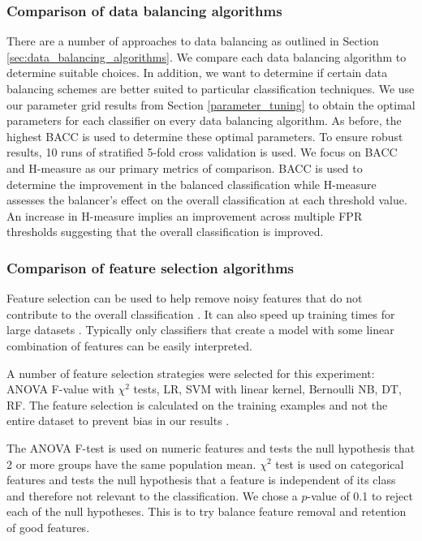 \documentclass{sig-alternate-05-2015}
\begin{document}
	\subsubsection{Comparison of data balancing algorithms}
	There are a number of approaches to data balancing as outlined in Section \ref{sec:data_balancing_algorithms}. We compare each data balancing algorithm to determine suitable choices. In addition, we want to determine if certain data balancing schemes are better suited to particular classification techniques. We use our parameter grid results from Section \ref{parameter_tuning} to obtain the optimal parameters for each classifier on every data balancing algorithm. As before, the highest BACC is used to determine these optimal parameters. To ensure robust results, 10 runs of stratified 5-fold cross validation is used. We focus on BACC and H-measure as our primary metrics of comparison. BACC is used to determine the improvement in the balanced classification while H-measure assesses the balancer's effect on the overall classification at each threshold value. An increase in H-measure implies an improvement across multiple FPR thresholds suggesting that the overall classification is improved.
	
	\subsubsection{Comparison of feature selection algorithms}
	Feature selection can be used to help remove noisy features that do not contribute to the overall classification \cite{Guyon:2003:IVF:944919.944968}. It can also speed up training times for large datasets \cite{Guyon:2003:IVF:944919.944968}. Typically only classifiers that create a model with some linear combination of features can be easily interpreted.
	
	A number of feature selection strategies were selected for this experiment: ANOVA F-value with $\chi^2$ tests, LR, SVM with linear kernel, Bernoulli NB, DT, RF. The feature selection is calculated on the training examples and not the entire dataset to prevent bias in our results \cite{PMID:25988841}.
	
	The ANOVA F-test is used on numeric features and tests the null hypothesis that 2 or more groups have the same population mean. $\chi^2$ test is used on categorical features and tests the null hypothesis that a feature is independent of its class and therefore not relevant to the classification. We chose a $p$-value of 0.1 to reject each of the null hypotheses. This is to try balance feature removal and retention of good features.
	
\end{document}
